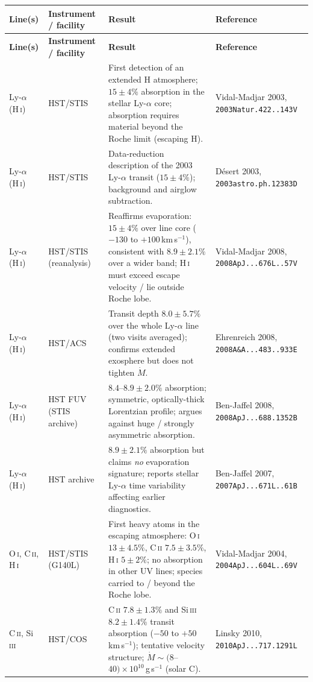 \begin{longtable}{@{}p{2.3cm}p{2.9cm}p{5.7cm}p{2.6cm}@{}}
\toprule
\textbf{Line(s)} & \textbf{Instrument / facility} & \textbf{Result} & \textbf{Reference} \\
\midrule
\endfirsthead
\toprule
\textbf{Line(s)} & \textbf{Instrument / facility} & \textbf{Result} & \textbf{Reference} \\
\midrule
\endhead
\bottomrule
\endfoot

Ly-$\alpha$ (H\,\textsc{i}) & HST/STIS & First detection of an extended H atmosphere; $15\pm4\%$ absorption in the stellar Ly-$\alpha$ core; absorption requires material beyond the Roche limit (escaping H). & Vidal-Madjar 2003, \texttt{2003Natur.422..143V} \\
Ly-$\alpha$ (H\,\textsc{i}) & HST/STIS & Data-reduction description of the 2003 Ly-$\alpha$ transit ($15\pm4\%$); background and airglow subtraction. & D\'esert 2003, \texttt{2003astro.ph.12383D} \\
Ly-$\alpha$ (H\,\textsc{i}) & HST/STIS (reanalysis) & Reaffirms evaporation: $15\pm4\%$ over line core ($-130$ to $+100$\,km\,s$^{-1}$), consistent with $8.9\pm2.1\%$ over a wider band; H\,\textsc{i} must exceed escape velocity / lie outside Roche lobe. & Vidal-Madjar 2008, \texttt{2008ApJ...676L..57V} \\
Ly-$\alpha$ (H\,\textsc{i}) & HST/ACS & Transit depth $8.0\pm5.7\%$ over the whole Ly-$\alpha$ line (two visits averaged); confirms extended exosphere but does not tighten $\dot M$. & Ehrenreich 2008, \texttt{2008A\&A...483..933E} \\
Ly-$\alpha$ (H\,\textsc{i}) & HST FUV (STIS archive) & $8.4$--$8.9\pm2.0\%$ absorption; symmetric, optically-thick Lorentzian profile; argues against huge / strongly asymmetric absorption. & Ben-Jaffel 2008, \texttt{2008ApJ...688.1352B} \\
Ly-$\alpha$ (H\,\textsc{i}) & HST archive & $8.9\pm2.1\%$ absorption but claims \emph{no} evaporation signature; reports stellar Ly-$\alpha$ time variability affecting earlier diagnostics. & Ben-Jaffel 2007, \texttt{2007ApJ...671L..61B} \\
O\,\textsc{i}, C\,\textsc{ii}, H\,\textsc{i} & HST/STIS (G140L) & First heavy atoms in the escaping atmosphere: O\,\textsc{i} $13\pm4.5\%$, C\,\textsc{ii} $7.5\pm3.5\%$, H\,\textsc{i} $5\pm2\%$; no absorption in other UV lines; species carried to / beyond the Roche lobe. & Vidal-Madjar 2004, \texttt{2004ApJ...604L..69V} \\
C\,\textsc{ii}, Si\,\textsc{iii} & HST/COS & C\,\textsc{ii} $7.8\pm1.3\%$ and Si\,\textsc{iii} $8.2\pm1.4\%$ transit absorption ($-50$ to $+50$\,km\,s$^{-1}$); tentative velocity structure; $\dot M \sim (8$--$40)\times10^{10}$\,g\,s$^{-1}$ (solar C). & Linsky 2010, \texttt{2010ApJ...717.1291L} \\

\end{longtable}
